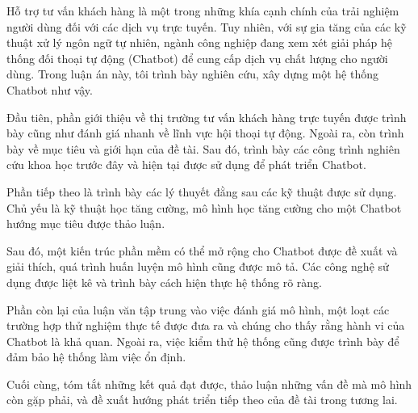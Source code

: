 \documentclass[12pt,a4paper,oneside]{book} %
\begin{document}
\begin{abstractTV}

Hỗ trợ tư vấn khách hàng là một trong những khía cạnh chính của trải nghiệm người dùng đối với các dịch vụ trực tuyến. Tuy nhiên, với sự gia tăng của các kỹ thuật xử lý ngôn ngữ tự nhiên, ngành công nghiệp đang xem xét giải pháp hệ thống đối thoại tự động (Chatbot) để cung cấp dịch vụ chất lượng cho người dùng. Trong luận án này, tôi trình bày nghiên cứu, xây dựng một hệ thống Chatbot như vậy.

Đầu tiên, phần giới thiệu về thị trường tư vấn khách hàng trực tuyến được trình bày cũng như đánh giá nhanh về lĩnh vực hội thoại tự động. Ngoài ra, còn trình bày về mục tiêu và giới hạn của đề tài. Sau đó, trình bày các công trình nghiên cứu khoa học trước đây và hiện tại được sử dụng để phát triển Chatbot. 

Phần tiếp theo là trình bày các lý thuyết đằng sau các kỹ thuật được sử dụng. Chủ yếu là kỹ thuật học tăng cường, mô hình học tăng cường cho một Chatbot hướng mục tiêu được thảo luận.

Sau đó, một kiến trúc phần mềm có thể mở rộng cho Chatbot được đề xuất và giải thích, quá trình huấn luyện mô hình cũng được mô tả. Các công nghệ sử dụng được liệt kê và trình bày cách hiện thực hệ thống rõ ràng.

Phần còn lại của luận văn tập trung vào việc đánh giá mô hình, một loạt các trường hợp thử nghiệm thực tế được đưa ra và chúng cho thấy rằng hành vi của Chatbot là khả quan. Ngoài ra, việc kiểm thử hệ thống cũng được trình bày để đảm bảo hệ thống làm việc ổn định.

Cuối cùng, tóm tắt những kết quả đạt được, thảo luận những vấn đề mà mô hình còn gặp phải, và đề xuất hướng phát triển tiếp theo của đề tài trong tương lai.

\end{abstractTV}	
\end{document}
